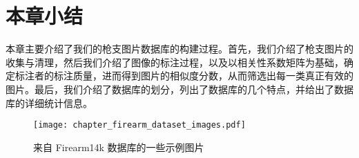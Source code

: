 \section{本章小结}
本章主要介绍了我们的枪支图片数据库的构建过程。首先，我们介绍了枪支图片的收集与清理，然后我们介绍了图像的标注过程，以及以相关性系数矩阵为基础，确定标注者的标注质量，进而得到图片的相似度分数，从而筛选出每一类真正有效的图片。最后，我们介绍了数据库的划分，列出了数据库的几个特点，并给出了数据库的详细统计信息。

\begin{figure}[!t]
	\centering
	\texttt{[image: chapter\_firearm\_dataset\_images.pdf]}
	\caption{来自 Firearm14k 数据库的一些示例图片}
	\label{fig:dataset_sample_images}
\end{figure}


